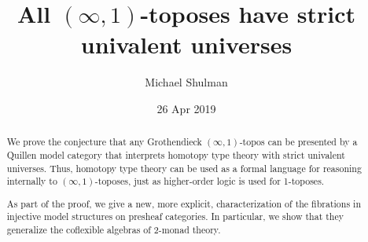 \documentclass[12pt]{amsart}
\title{All $(\infty,1)$-toposes have strict univalent universes}
\author{Michael Shulman}
\date{26 Apr 2019}
\def\io{\ensuremath{(\infty,1)}}
\begin{document}
\maketitle

\begin{abstract}
  We prove the conjecture that any Grothendieck \io-topos can be presented by a Quillen model category that interprets homotopy type theory with strict univalent universes.
  Thus, homotopy type theory can be used as a formal language for reasoning internally to \io-toposes, just as higher-order logic is used for 1-toposes.

  As part of the proof, we give a new, more explicit, characterization of the fibrations in injective model structures on presheaf categories.
  In particular, we show that they generalize the coflexible algebras of 2-monad theory.
\end{abstract}

\DeclareRobustCommand{\gobblefive}[5]{}
\newcommand*{\skiptoc}{\addtocontents{toc}{\gobblefive}}
\setcounter{tocdepth}{1}

\newpage
\tableofcontents
\newpage




















\appendix





\end{document}
